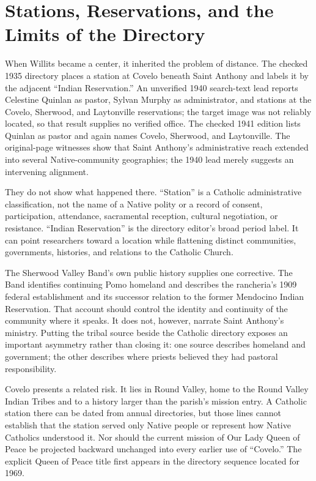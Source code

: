 \section{Stations, Reservations, and the Limits of the Directory}

When Willits became a center, it inherited the problem of distance. The checked 1935 directory places a station at Covelo beneath Saint Anthony and labels it by the adjacent ``Indian Reservation.'' An unverified 1940 search-text lead reports Celestine Quinlan as pastor, Sylvan Murphy as administrator, and stations at the Covelo, Sherwood, and Laytonville reservations; the target image was not reliably located, so that result supplies no verified office. The checked 1941 edition lists Quinlan as pastor and again names Covelo, Sherwood, and Laytonville. The original-page witnesses show that Saint Anthony's administrative reach extended into several Native-community geographies; the 1940 lead merely suggests an intervening alignment.

They do not show what happened there. ``Station'' is a Catholic administrative classification, not the name of a Native polity or a record of consent, participation, attendance, sacramental reception, cultural negotiation, or resistance. ``Indian Reservation'' is the directory editor's broad period label. It can point researchers toward a location while flattening distinct communities, governments, histories, and relations to the Catholic Church.

The Sherwood Valley Band's own public history supplies one corrective. The Band identifies continuing Pomo homeland and describes the rancheria's 1909 federal establishment and its successor relation to the former Mendocino Indian Reservation. That account should control the identity and continuity of the community where it speaks. It does not, however, narrate Saint Anthony's ministry. Putting the tribal source beside the Catholic directory exposes an important asymmetry rather than closing it: one source describes homeland and government; the other describes where priests believed they had pastoral responsibility.

Covelo presents a related risk. It lies in Round Valley, home to the Round Valley Indian Tribes and to a history larger than the parish's mission entry. A Catholic station there can be dated from annual directories, but those lines cannot establish that the station served only Native people or represent how Native Catholics understood it. Nor should the current mission of Our Lady Queen of Peace be projected backward unchanged into every earlier use of ``Covelo.'' The explicit Queen of Peace title first appears in the directory sequence located for 1969.

